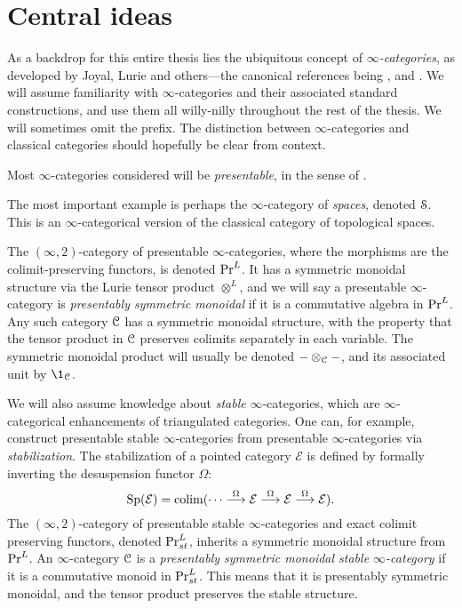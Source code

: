 
\section{Central ideas}
\label{ch0:sec:Central-ideas}

As a backdrop for this entire thesis lies the ubiquitous concept of \emph{$\infty$-categories}, as developed by Joyal, Lurie and others---the canonical references being \cite{joyal_02}, \cite{lurie_09} and \cite{Lurie_HA}. We will assume familiarity with $\infty$-categories and their associated standard constructions, and use them all willy-nilly throughout the rest of the thesis. We will sometimes omit the prefix. The distinction between $\infty$-categories and classical categories should hopefully be clear from context.  

Most $\infty$-categories considered will be \emph{presentable}, in the sense of \cite[Chapter 5]{lurie_09}. 

\begin{example}
    The most important example is perhaps the $\infty$-category of \emph{spaces}, denoted $\EuScript{S}$. This is an $\infty$-categorical version of the classical category of topological spaces. 
\end{example}

The $(\infty, 2)$-category of presentable $\infty$-categories, where the morphisms are the colimit-preserving functors, is denoted $\mathrm{Pr}^L$. It has a symmetric monoidal structure via the Lurie tensor product $\otimes^L$, and we will say a presentable $\infty$-category is \emph{presentably symmetric monoidal} if it is a commutative algebra in $\mathrm{Pr}^L$. Any such category $\EuScript{C}$ has a symmetric monoidal structure, with the property that the tensor product in $\EuScript{C}$ preserves colimits separately in each variable. The symmetric monoidal product will usually be denoted $-\otimes_{\EuScript{C}} -$, and its associated unit by $\1_\C$. 

We will also assume knowledge about \emph{stable} $\infty$-categories, which are $\infty$-categorical enhancements of triangulated categories. One can, for example, construct presentable stable $\infty$-categories from presentable $\infty$-categories via \emph{stabilization}. The stabilization of a pointed category $\mathcal{E}$ is defined by formally inverting the desuspension functor $\Omega$:
\[\mathrm{Sp}(\mathcal{E}) = \operatorname{colim} (\cdots\overset{\Omega}{\longrightarrow}\mathcal{E}\overset{\Omega}{\longrightarrow}\mathcal{E}\overset{\Omega}{\longrightarrow}\mathcal{E}).\] 
The $(\infty, 2)$-category of presentable stable $\infty$-categories and exact colimit preserving functors, denoted $\mathrm{Pr}_{st}^L$, inherits a symmetric monoidal structure from $\mathrm{Pr}^L$. An $\infty$-category $\EuScript{C}$ is a \emph{presentably symmetric monoidal stable $\infty$-category} if it is a commutative monoid in $\mathrm{Pr}_{st}^L$. This means that it is presentably symmetric monoidal, and the tensor product preserves the stable structure. 

